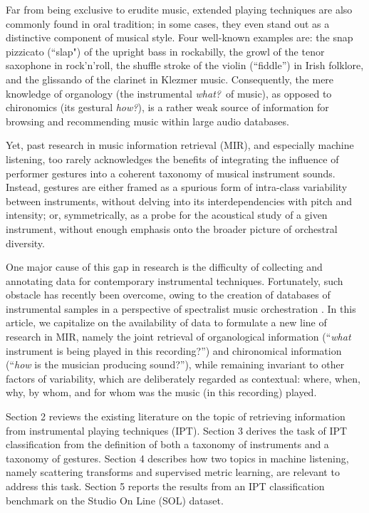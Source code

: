 \documentclass{article}
\begin{document}
Far from being exclusive to erudite music, extended playing techniques are also commonly found in oral tradition; in some cases, they even stand out as a distinctive component of musical style.
Four well-known examples are:
the snap pizzicato (``slap") of the upright bass in rockabilly,
the growl of the tenor saxophone in rock'n'roll,
the shuffle stroke of the violin (``fiddle'') in Irish folklore,
and the glissando of the clarinet in Klezmer music.
Consequently, the mere knowledge of organology (the instrumental \emph{what?}~of music), as opposed to chironomics (its gestural \emph{how?}), is a rather weak source of information for browsing and recommending music within large audio databases.

Yet, past research in music information retrieval (MIR), and especially machine listening, too rarely acknowledges the benefits of integrating the influence of performer gestures into a coherent taxonomy of musical instrument sounds.
Instead, gestures are either framed as a spurious form of intra-class variability between instruments, without delving into its interdependencies with pitch and intensity;
or, symmetrically, as a probe for the acoustical study of a given instrument, without enough emphasis onto the broader picture of orchestral diversity.

One major cause of this gap in research is the difficulty of collecting and annotating data for contemporary instrumental techniques.
Fortunately, such obstacle has recently been overcome, owing to the creation of databases of instrumental samples in a perspective of spectralist music orchestration \cite{maresz2013cmr}.
In this article, we capitalize on the availability of data to formulate a new line of research in MIR, namely the joint retrieval of organological information (``\emph{what} instrument is being played in this recording?'') and chironomical information (``\emph{how} is the musician producing sound?''), while remaining invariant to other factors of variability, which are deliberately regarded as contextual: where, when, why, by whom, and for whom was the music (in this recording) played.

Section 2 reviews the existing literature on the topic of retrieving information from instrumental playing techniques (IPT).
Section 3 derives the task of IPT classification from the definition of both a taxonomy of instruments and a taxonomy of gestures.
Section 4 describes how two topics in machine listening, namely scattering transforms and supervised metric learning, are relevant to address this task.
Section 5 reports the results from an IPT classification benchmark on the Studio On Line (SOL) dataset.
\end{document}
